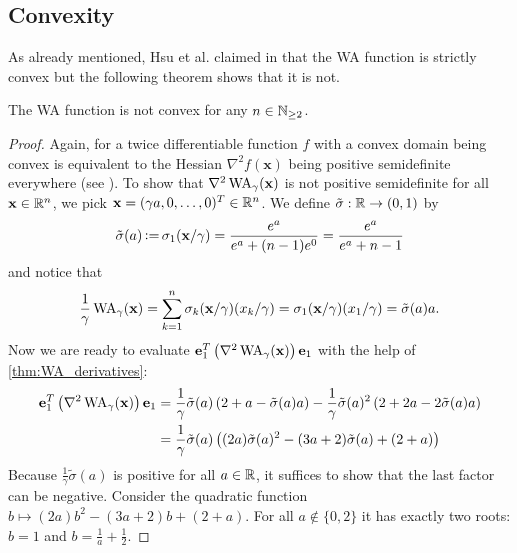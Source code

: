 \subsection{Convexity} \label{sec:WA_convexity}

As already mentioned, Hsu et al. claimed in \cite{HsuChangBalabanov-AnalyticalPlacementFor3dIcDesigns} that the WA function is strictly convex
but the following theorem shows that it is not.

\begin{theorem} \label{thm:WA_is_not_convex}
 The WA function is not convex for any \(n \in \mathbb{N}_{\geq 2}\).
\end{theorem}

\begin{proof} 
 Again, for a twice differentiable function \(f\) with a convex domain being convex is equivalent to the Hessian \(\nabla^2 f(\mathbf{x})\) being positive semidefinite everywhere
 (see \cite[p. 71]{BoydVandenberghe-ConvexOptimization}).
 To show that \(\nabla^2 \operatorname{WA}_\gamma(\mathbf{x})\) is not positive semidefinite for all \(\mathbf{x} \in \mathbb{R}^n\), we pick \(\mathbf{x} = ( \gamma a, 0, \ldots, 0)^T \in \mathbb{R}^n\).
 We define \(\tilde{\sigma}: \mathbb{R} \to (0, 1)\) by
 \[\tilde{\sigma}(a) \operatorname{\vcentcolon=} \sigma_1(\mathbf{x}/\gamma) = \frac{e^a}{e^a + (n-1)e^0} = \frac{e^a}{e^a + n-1}\]
 and notice that
 \[ \frac{1}{\gamma} \operatorname{WA}_\gamma(\mathbf{x}) = \sum_{k=1}^n \sigma_k(\mathbf{x} / \gamma) (x_k / \gamma) = \sigma_1(\mathbf{x} / \gamma) (x_1 / \gamma) = \tilde{\sigma}(a) a .\]
 Now we are ready to evaluate \(\mathbf{e}_1^T \left({ \nabla^2 \operatorname{WA}_\gamma(\mathbf{x}) }\right) \mathbf{e}_1\) with the help of \cref{thm:WA_derivatives}:
 \begin{align*}
  \mathbf{e}_1^T \left({ \nabla^2 \operatorname{WA}_\gamma(\mathbf{x}) }\right) \mathbf{e}_1 &= \frac{1}{\gamma} \tilde{\sigma}(a) \left({ 2 + a - \tilde{\sigma}(a) a }\right) - \frac{1}{\gamma} \tilde{\sigma}(a)^2 \left({ 2 + 2 a - 2 \tilde{\sigma}(a) a }\right) \\
                                                                   &= \frac{1}{\gamma} \tilde{\sigma}(a) \left({ (2a) \tilde{\sigma}(a)^2 - (3a + 2)\tilde{\sigma}(a) + (2 + a) }\right)
 \end{align*}
 Because \(\frac{1}{\gamma} \tilde{\sigma}(a)\) is positive for all \(a \in \mathbb{R}\), it suffices to show that the last factor can be negative.
 Consider the quadratic function \(b \mapsto (2a)b^2 - (3a + 2)b + (2 + a)\).
 For all \(a \notin \{0, 2\}\) it has exactly two roots: \(b = 1\) and \(b = \frac{1}{a} + \frac{1}{2}\).
 

\end{proof}
